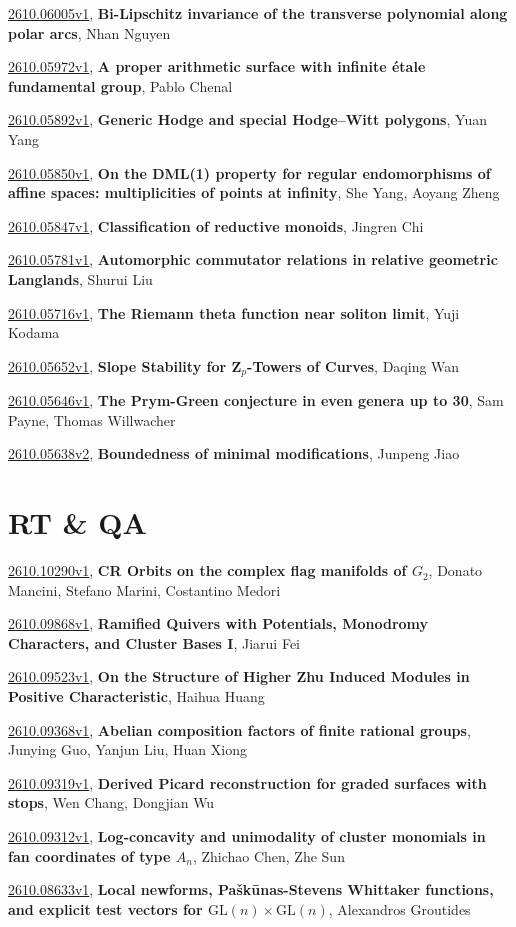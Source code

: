 \documentclass[9pt, a4paper]{article}
\theoremstyle{plain}
\theoremstyle{definition}
\theoremstyle{remark}
\newcommand{\arxiv}[3]{\href{https://arxiv.org/abs/#1}{#1}, \textbf{\textcolor{arxivblue}{#2}}, #3}
\begin{document}
\arxiv{2610.06005v1}{Bi-Lipschitz invariance of the transverse polynomial along polar arcs}{Nhan Nguyen}

\arxiv{2610.05972v1}{A proper arithmetic surface with infinite étale fundamental group}{Pablo Chenal}

\arxiv{2610.05892v1}{Generic Hodge and special Hodge--Witt polygons}{Yuan Yang}

\arxiv{2610.05850v1}{On the DML(1) property for regular endomorphisms of affine spaces: multiplicities of points at infinity}{She Yang, Aoyang Zheng}

\arxiv{2610.05847v1}{Classification of reductive monoids}{Jingren Chi}

\arxiv{2610.05781v1}{Automorphic commutator relations in relative geometric Langlands}{Shurui Liu}

\arxiv{2610.05716v1}{The Riemann theta function near soliton limit}{Yuji Kodama}

\arxiv{2610.05652v1}{Slope Stability for ${\mathbf Z}_p$-Towers of Curves}{Daqing Wan}

\arxiv{2610.05646v1}{The Prym-Green conjecture in even genera up to 30}{Sam Payne, Thomas Willwacher}

\arxiv{2610.05638v2}{Boundedness of minimal modifications}{Junpeng Jiao}


\section{RT \& QA}
\arxiv{2610.10290v1}{CR Orbits on the complex flag manifolds of $G_2$}{Donato Mancini, Stefano Marini, Costantino Medori}

\arxiv{2610.09868v1}{Ramified Quivers with Potentials, Monodromy Characters, and Cluster Bases I}{Jiarui Fei}

\arxiv{2610.09523v1}{On the Structure of Higher Zhu Induced Modules in Positive Characteristic}{Haihua Huang}

\arxiv{2610.09368v1}{Abelian composition factors of finite rational groups}{Junying Guo, Yanjun Liu, Huan Xiong}

\arxiv{2610.09319v1}{Derived Picard reconstruction for graded surfaces with stops}{Wen Chang, Dongjian Wu}

\arxiv{2610.09312v1}{Log-concavity and unimodality of cluster monomials in fan coordinates of type $A_n$}{Zhichao Chen, Zhe Sun}

\arxiv{2610.08633v1}{Local newforms, Paškūnas-Stevens Whittaker functions, and explicit test vectors for $\mathrm{GL}(n)\times \mathrm{GL}(n)$}{Alexandros Groutides}
\end{document}
